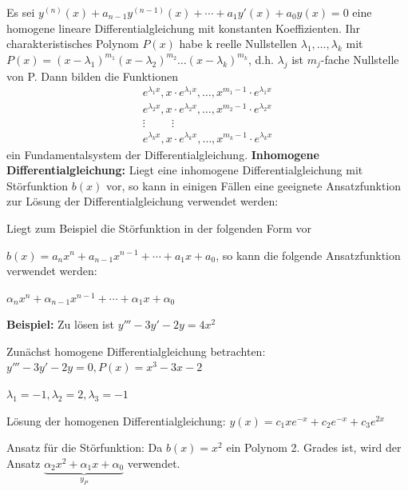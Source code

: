 \documentclass[fontset=ubuntu,12pt,a4paper,fleqn]{article}
\begin{document}
\begin{multicols}{2}
Es sei \(y^{(n)}(x) + a_{n-1} y^{(n-1)}(x) + \cdots + a_1 y'(x) + a_0 y(x) = 0\) eine homogene lineare Differentialgleichung mit konstanten Koeffizienten. Ihr charakteristisches Polynom \(P(x)\) habe k reelle Nullstellen \(\lambda_1,\dots,\lambda_k\) mit \(P(x)={(x-\lambda_1)}^{m_1}{(x-\lambda_2)}^{m_2} \dots {(x-\lambda_k)}^{m_k}\), d.h. \(\lambda_j\) ist \(m_j\)-fache Nullstelle von P. Dann bilden die Funktionen
\begin{align*}
e^{\lambda_1 x},x \cdot e^{\lambda_1 x},\dots,x^{m_1-1} \cdot e^{\lambda_1 x} \\
e^{\lambda_2 x},x \cdot e^{\lambda_2 x},\dots,x^{m_2-1} \cdot e^{\lambda_2 x} \\
\vdots \hspace{1cm} \vdots \hspace{1cm} \\
e^{\lambda_k x},x \cdot e^{\lambda_k x},\dots,x^{m_k-1} \cdot e^{\lambda_k x}
\end{align*}
ein Fundamentalsystem der Differentialgleichung.
\textbf{Inhomogene Differentialgleichung:}
Liegt eine inhomogene Differentialgleichung mit Störfunktion \(b(x)\) vor, so kann in einigen Fällen eine geeignete Ansatzfunktion zur Lösung der Differentialgleichung verwendet werden:

Liegt zum Beispiel die Störfunktion in der folgenden Form vor

\(b(x)=a_n x^n + a_{n-1} x^{n-1} + \cdots + a_1 x + a_0\), so kann die folgende Ansatzfunktion verwendet werden:

\(\alpha_n x^n + \alpha_{n-1} x^{n-1} + \cdots + \alpha_1 x + \alpha_0\)
\end{multicols}
\newpage














\textbf{Beispiel:}
Zu lösen ist \(y'''-3y'-2y=4x^2\)

Zunächst homogene Differentialgleichung betrachten: \(y'''-3y'-2y=0,P(x)=x^3-3x-2\)

\(\lambda_1=-1,\lambda_2=2,\lambda_3=-1\)

Lösung der homogenen Differentialgleichung: \(y(x)=c_1xe^{-x}+c_2e^{-x}+c_3e^{2x}\)

Ansatz für die Störfunktion: Da \(b(x)=x^2\) ein Polynom 2. Grades ist, wird der Ansatz \(\underbrace{\alpha_2x^2+\alpha_1x+\alpha_0}_{y_P}\) verwendet.
\end{document}
